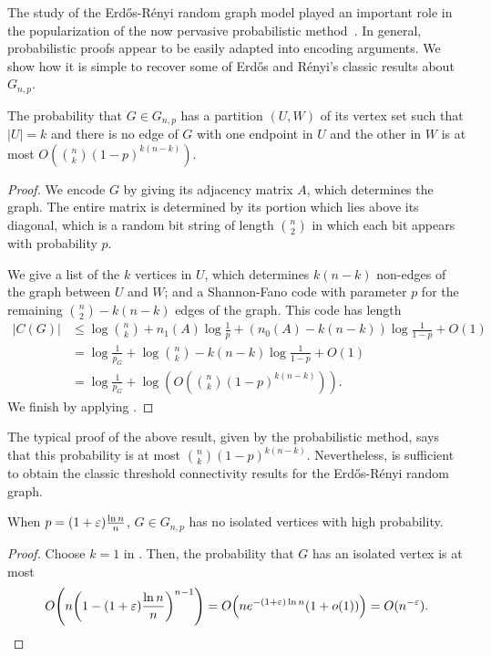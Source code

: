 The study of the Erd\H{o}s-R\'{e}nyi random graph model played an
important role in the popularization of the now pervasive
probabilistic method~\cite{alon:probabilistic, erdos:randomgraphs}. In
general, probabilistic proofs appear to be easily adapted into
encoding arguments. We show how it is simple to recover some of
Erd\H{o}s and R\'{e}nyi's classic results about $G_{n, p}$.

\begin{lem}
  The probability that $G \in G_{n, p}$ has a partition $(U, W)$ of
  its vertex set such that $|U| = k$ and there is no edge of $G$ with
  one endpoint in $U$ and the other in $W$ is at most
  $O\left({n \choose k} (1 - p)^{k (n - k)}\right)$.
\end{lem}
\begin{proof}
  We encode $G$ by giving its adjacency matrix $A$, which determines
  the graph. The entire matrix is determined by its portion which lies
  above its diagonal, which is a random bit string of length
  $\binom{n}{2}$ in which each bit appears with probability $p$.

  We give a list of the $k$ vertices in $U$, which determines
  $k(n - k)$ non-edges of the graph between $U$ and $W$; and a
  Shannon-Fano code with parameter $p$ for the remaining
  $\binom{n}{2} - k(n - k)$ edges of the graph. This code has length
  \begin{align*}
    |C(G)| &\leq \log {n \choose k} + n_1(A) \log \frac{1}{p} + (n_0(A) - k(n - k)) \log \frac{1}{1 - p} + O(1) \\
           &= \log \frac{1}{p_G} + \log {n \choose k} - k(n - k) \log \frac{1}{1 - p} + O(1) \\
           &= \log \frac{1}{p_G} + \log \left(O\left({n \choose k} (1 - p)^{k(n - k)}\right)\right).
  \end{align*}
  We finish by applying .
\end{proof}

The typical proof of the above result, given by the probabilistic
method, says that this probability is at most
$\binom{n}{k} (1 - p)^{k (n - k)}$. Nevertheless,
 is sufficient to obtain the classic
threshold connectivity results for the Erd\H{o}s-R\'{e}nyi random
graph.

%
\begin{thm}
  When $p = (1 + \varepsilon) \frac{\ln n}{n}$, $G \in G_{n, p}$ has no
  isolated vertices with high probability.
\end{thm}
\begin{proof}
  Choose $k = 1$ in . Then, the probability
  that $G$ has an isolated vertex is at most
  \[
  O\left(n \left(1 - (1 + \eps) \frac{\ln n}{n}\right)^{n - 1}\right) =  O\left(n e^{-(1 + \eps) \ln n} (1 + o(1))\right) = O(n^{-\eps}). \hfill \qedhere
  \]
\end{proof}


